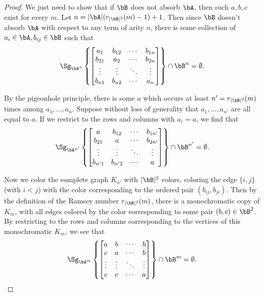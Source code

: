 \begin{proof} We just need to show that if $\bB$ does not absorb $\bA$, then such $a,b,c$ exist for every $m$. Let $n = |\bA|(r_{|\bB|^2}(m)-1) + 1$. Then since $\bB$ doesn't absorb $\bA$ with respect to any term of arity $n$, there is some collection of $a_i \in \bA, b_{ij} \in \bB$ such that
\[
\Sg_{\bA^n}\left\{\begin{bmatrix} a_1 & b_{12} & \cdots & b_{1n}\\ b_{21} & a_2 & \cdots & b_{2n}\\ \vdots & \vdots & \ddots & \vdots\\ b_{n1} & b_{n2} & \cdots & a_n\end{bmatrix}\right\} \cap \bB^n = \emptyset.
\]

By the pigeonhole principle, there is some $a$ which occurs at least $n' = r_{|\bB|^2}(m)$ times among $a_1, ..., a_n$. Suppose without loss of generality that $a_1, ..., a_{n'}$ are all equal to $a$. If we restrict to the rows and columns with $a_i = a$, we find that
\[
\Sg_{\bA^{n'}}\left\{\begin{bmatrix} a & b_{12} & \cdots & b_{1n'}\\ b_{21} & a & \cdots & b_{2n'}\\ \vdots & \vdots & \ddots & \vdots\\ b_{n'1} & b_{n'2} & \cdots & a\end{bmatrix}\right\} \cap \bB^{n'} = \emptyset.
\]

Now we color the complete graph $K_{n'}$ with $|\bB|^2$ colors, coloring the edge $\{i,j\}$ (with $i < j$) with the color corresponding to the ordered pair $(b_{ij},b_{ji})$. Then by the definition of the Ramsey number $r_{|\bB|^2}(m)$, there is a monochromatic copy of $K_m$, with all edges colored by the color corresponding to some pair $(b,c) \in \bB^2$. By restricting to the rows and columns corresponding to the vertices of this monochromatic $K_m$, we see that
\[
\Sg_{\bA^{m}}\left\{\begin{bmatrix} a & b & \cdots & b\\ c & a & \cdots & b\\ \vdots & \vdots & \ddots & \vdots\\ c & c & \cdots & a\end{bmatrix}\right\} \cap \bB^{m} = \emptyset.\qedhere
\]
\end{proof}

